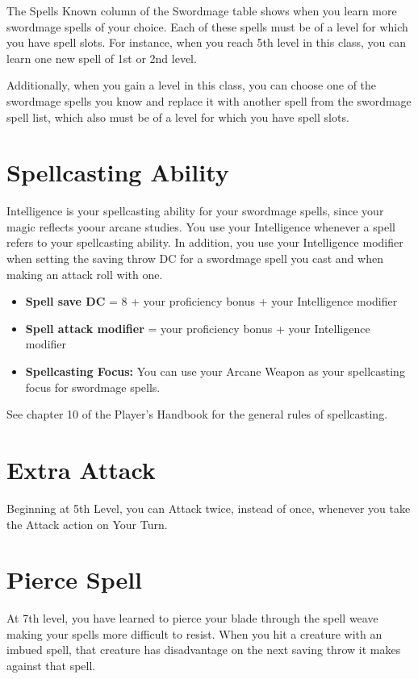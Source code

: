 \begin{multicols*}{2}
The Spells Known column of the Swordmage table shows
when you learn more swordmage spells of your choice. Each
of these spells must be of a level for which you have spell
slots. For instance, when you reach 5th level in this class, you
can learn one new spell of 1st or 2nd level.

Additionally, when you gain a level in this class, you can
choose one of the swordmage spells you know and replace it
with another spell from the swordmage spell list, which also
must be of a level for which you have spell slots.

\section*{Spellcasting Ability}
Intelligence is your spellcasting ability for your swordmage
spells, since your magic reflects yoour arcane studies. You
use your Intelligence whenever a spell refers to your
spellcasting ability. In addition, you use your Intelligence
modifier when setting the saving throw DC for a swordmage
spell you cast and when making an attack roll with one.

\begin{itemize}
    \item \textbf{Spell save DC} = 8 + your proficiency bonus + your
    Intelligence modifier
    \item \textbf{Spell attack modifier} = your proficiency bonus + your
    Intelligence modifier
    \item \textbf{Spellcasting Focus:} You can use your Arcane Weapon as
    your spellcasting focus for swordmage spells.
\end{itemize}


See chapter 10 of the Player’s Handbook for the general
rules of spellcasting.

\section*{Extra Attack}

Beginning at 5th Level, you can Attack twice, instead of once, whenever you take the Attack action on Your Turn.    

\section*{Pierce Spell}


At 7th level, you have learned to pierce your blade through the spell weave making your spells more difficult to resist. When you hit a creature with an imbued spell, that creature has disadvantage on the next saving throw it makes against that spell.



\end{multicols*}
